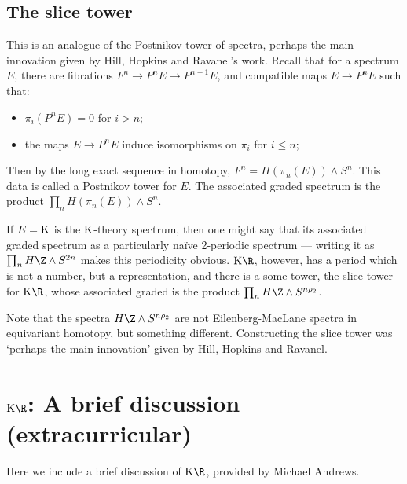 \documentclass[11pt]{article}
\newcommand{\Extracurricular}[1]{
\section*{#1 {\small(extracurricular)}}
}
\begin{document}
\begin{FirstNineLectures}
\subsection*{The slice tower}
This is an analogue of the Postnikov tower of spectra, perhaps the main
innovation given by Hill, Hopkins and Ravanel's work. Recall that for a spectrum $E$, there are
fibrations $F^n\to P^nE\to P^{n-1}E$, and compatible maps $E\to P^nE$ such that:
\begin{itemize}\squishlist
\item $\pi_{i}(P^n E)=0$ for $i>n$;
\item the maps $E\to P^nE$ induce isomorphisms on $\pi_{i}$ for $i\leq n$;
\end{itemize}
Then by the long exact sequence in homotopy, $F^n=H(\pi_n(E))\wedge S^n$. This
data is called a Postnikov tower for $E$.
The associated graded spectrum is the product $\prod_nH(\pi_n(E))\wedge S^n$.

If $E=\operatorname{{K}}$ is the $\operatorname{{K}}$-theory spectrum, then one might say that its associated
graded spectrum as a particularly na\"ive 2-periodic spectrum --- writing it as
$\prod_n {H\Z}\wedge S^{2n}$ makes this periodicity obvious. $\KR$, however, has
a period which is not a number, but a representation, and there is a some tower,
the slice tower for $\KR$, whose associated graded is the product $\prod_n
{H\Z}\wedge S^{n\rho_2}$.

Note that the spectra ${H\Z}\wedge S^{n\rho_2}$ are not Eilenberg-MacLane
spectra in equivariant homotopy, but something different. Constructing the slice
tower was `perhaps the main innovation' given by Hill, Hopkins and Ravanel.

\Extracurricular{$\KR$: A brief discussion}
Here we include a brief discussion of $\KR$, provided by Michael Andrews.

\end{FirstNineLectures}
\end{document}
